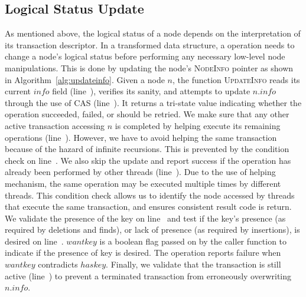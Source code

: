 \documentclass[]{sig-alternate-05-2015}
\begin{document}
\subsection{Logical Status Update}
\label{sec:logicalupdate}
As mentioned above, the logical status of a node depends on the interpretation of its transaction descriptor. 
In a transformed data structure, a operation needs to change a node's logical status before performing any necessary low-level node manipulations. 
This is done by updating the node's \textsc{NodeInfo} pointer as shown in Algorithm~\ref{alg:updateinfo}. 
Given a node $n$, the function \textsc{UpdateInfo} reads its current $info$ field (line~), verifies its sanity, and attempts to update $n.info$ through the use of CAS (line~).
It returns a tri-state value indicating whether the operation succeeded, failed, or should be retried.
We make sure that any other active transaction accessing $n$ is completed by helping execute its remaining operations (line~).
However, we have to avoid helping the same transaction because of the hazard of infinite recursions.
This is prevented by the condition check on line~.
We also skip the update and report success if the operation has already been performed by other threads (line~).
Due to the use of helping mechanism, the same operation may be executed multiple times by different threads.
This condition check allows us to identify the node accessed by threads that execute the same transaction, and ensures consistent result code is return.
We validate the presence of the key on line~ and test if the key's presence (as required by deletions and finds), or lack of presence (as required by insertions), is desired on line~.
$wantkey$ is a boolean flag passed on by the caller function to indicate if the presence of key is desired.
The operation reports failure when $wantkey$ contradicts $haskey$.
Finally, we validate that the transaction is still active (line~) to prevent a terminated transaction from erroneously overwriting $n.info$.
\end{document}
